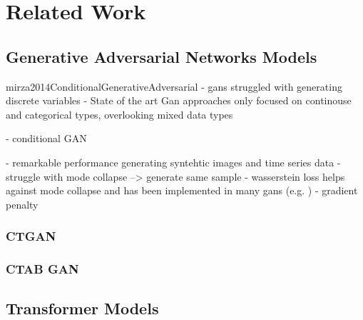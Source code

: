 \chapter{Related Work}
\label{ch:relatedWork}


\section{Generative Adversarial Networks Models}
\label{ch:relatedWork-generativeAdversarialNetworksModels}


mirza2014ConditionalGenerativeAdversarial
- gans struggled with generating discrete variables \cite{torfi2020CorGANCorrelationCapturingConvolutionala}
- State of the art Gan approaches only focused on continouse and categorical types, overlooking mixed data types \cite{zhao2022CTABGANEnhancingTabular}

- conditional GAN \cite{mirza2014ConditionalGenerativeAdversarial}


- remarkable performance generating syntehtic images and time series data \cite{mckeever2020SynthesisingTabularDatasets}
- struggle with mode collapse --> generate same sample \cite{torfi2020CorGANCorrelationCapturingConvolutionala}
- wasserstein loss helps against mode collapse \cite{frogner2015LearningWassersteinLoss} \cite{arjovsky2017WassersteinGenerativeAdversarial} and has been implemented in many gans (e.g. \cite{zhao2022CTABGANEnhancingTabular})
- gradient penalty \cite{gulrajani2017ImprovedTrainingWasserstein}


\subsection{CTGAN}
\label{ch:relatedWork-generativeAdversarialNetworksModels-ctgan}

\subsection{CTAB GAN}
\label{ch:relatedWork-generativeAdversarialNetworksModels-ctabGAN}
\section{Transformer Models}
\label{ch:relatedWork-transformers}

